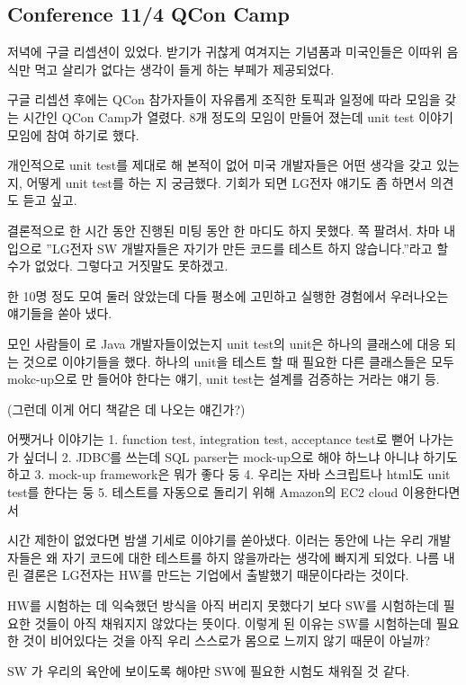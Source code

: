 \documentclass[a4paper]{article}
\begin{document}
\subsection{Conference 11/4 QCon Camp}
 
저녁에 구글 리셉션이 있었다. 받기가 귀찮게 여겨지는 기념품과 미국인들은 이따위 음식만 먹고 살리가 없다는 생각이 들게 하는 부페가 제공되었다. 
 
구글 리셉션 후에는 QCon 참가자들이 자유롭게 조직한 토픽과 일정에 따라 모임을 갖는 시간인 QCon Camp가 열렸다. 8개 정도의 모임이 만들어 졌는데 unit test 이야기 모임에 참여 하기로 했다.
 
개인적으로 unit test를 제대로 해 본적이 없어 미국 개발자들은 어떤 생각을 갖고 있는지, 어떻게 unit test를 하는 지 궁금했다. 기회가 되면 LG전자 얘기도 좀 하면서 의견도 듣고 싶고.
 
결론적으로 한 시간 동안 진행된  미팅 동안 한 마디도 하지 못했다. 쪽 팔려서. 차마 내 입으로 ”LG전자 SW 개발자들은 자기가 만든 코드를 테스트 하지 않습니다.”라고 할 수가 없었다. 그렇다고 거짓말도 못하겠고.
 
한 10명 정도 모여 둘러 앉았는데 다들 평소에 고민하고 실행한 경험에서 우러나오는 얘기들을 쏟아 냈다. 
 
모인 사람들이 로 Java  개발자들이었는지 unit test의 unit은 하나의 클래스에 대응 되는 것으로 이야기들을 했다. 하나의  unit을 테스트 할 때 필요한 다른 클래스들은 모두 mokc-up으로 만
들어야 한다는 얘기, unit test는 설계를 검증하는 거라는 얘기 등.
 
(그런데 이게 어디 책같은 데 나오는 얘긴가?)
 
어쨋거나 이야기는 
1. function test, integration test, acceptance test로 뻗어 나가는 가 싶더니 
2. JDBC를 쓰는데 SQL parser는  mock-up으로 해야 하느냐 아니냐 하기도 하고 
3. mock-up framework은 뭐가 좋다 둥 
4. 우리는 자바 스크립트나 html도 unit test를 한다는 둥
5. 테스트를 자동으로 돌리기 위해 Amazon의 EC2 cloud 이용한다면서 
 
시간 제한이 없었다면 밤샐 기세로 이야기를 쏟아냈다. 이러는 동안에 나는 우리 개발자들은 왜 자기 코드에 대한 테스트를 하지 않을까라는 생각에 빠지게 되었다. 나름 내린 결론은 LG전자는 HW를 만드는 기업에서 출발했기 때문이다라는 것이다.
 
HW를 시험하는 데 익숙했던 방식을 아직 버리지 못했다기 보다 SW를 시험하는데 필요한 것들이 아직 채워지지 않았다는 뜻이다. 이렇게 된 이유는 SW를 시험하는데 필요한 것이 비어있다는 것을 아직 우리 스스로가 몸으로 느끼지 않기 때문이 아닐까? 
 
SW 가 우리의 육안에 보이도록 해야만 SW에 필요한 시험도 채워질 것 같다.
 
\end{document}
